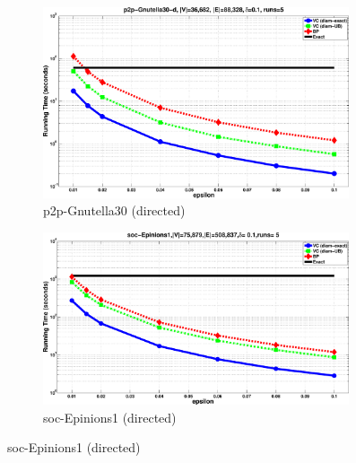 \begin{figure}[ht]
  \centering
  \begin{subfigure}[b]{0.46\textwidth}
    \includegraphics[width=0.99\textwidth,keepaspectratio]{figures/eps/p2p-Gnutella30-time}
    \caption{p2p-Gnutella30 (directed)}
    \label{fig:gnutella:time}
  \end{subfigure}
  \ifproof
  \hfill
  \begin{subfigure}[b]{0.46\textwidth}
    \includegraphics[width=0.99\textwidth,keepaspectratio]{figures/eps/soc-Epinions1-time}
    \caption{soc-Epinions1 (directed)}
    \label{fig:Epinions:time}
  \end{subfigure}


\end{figure}
